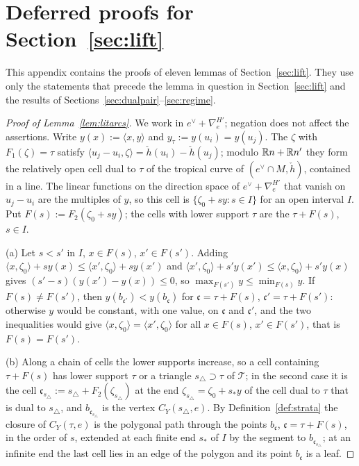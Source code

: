 \section{Deferred proofs for Section~\ref{sec:lift}}\label{app:liftproofs}

This appendix contains the proofs of eleven lemmas of Section~\ref{sec:lift}. They use only the statements that precede
the lemma in question in Section~\ref{sec:lift} and the results of Sections~\ref{sec:dualpair}--\ref{sec:regime}.

\begin{proof}[Proof of Lemma~\ref{lem:litarcs}]
We work in $e^\vee+\nabla^{H'}_e$; negation does not affect the assertions. Write $y(x):=\langle x,y\rangle$ and
$y_\tau:=y(u_i)=y(u_j)$. The $\zeta$ with $F_1(\zeta)=\tau$ satisfy $\langle u_j-u_i,\zeta\rangle=\check h(u_i)-\check
h(u_j)$; modulo $\mathbb R n+\mathbb R n'$ they form the relatively open cell dual to $\tau$ of the tropical curve of $(e^\vee\cap
M,\check h)$, contained in a line. The linear functions on the direction space of $e^\vee+\nabla^{H'}_e$ that vanish on
$u_j-u_i$ are the multiples of $y$, so this cell is $\{\zeta_0+sy:s\in I\}$ for an open interval $I$. Put
$F(s):=F_2(\zeta_0+sy)$; the cells with lower support $\tau$ are the $\tau+F(s)$, $s\in I$.

(a) Let $s<s'$ in $I$, $x\in F(s)$, $x'\in F(s')$. Adding $\langle x,\zeta_0\rangle+sy(x)\le\langle
x',\zeta_0\rangle+sy(x')$ and $\langle x',\zeta_0\rangle+s'y(x')\le\langle x,\zeta_0\rangle+s'y(x)$ gives
$(s'-s)(y(x')-y(x))\le0$, so $\max_{F(s')}y\le\min_{F(s)}y$. If $F(s)\ne F(s')$, then $y(b_{\mathfrak
c'})<y(b_{\mathfrak c})$ for $\mathfrak c=\tau+F(s)$, $\mathfrak c'=\tau+F(s')$: otherwise $y$ would be constant, with
one value, on $\mathfrak c$ and $\mathfrak c'$, and the two inequalities would give $\langle x,\zeta_0\rangle=\langle
x',\zeta_0\rangle$ for all $x\in F(s)$, $x'\in F(s')$, that is $F(s)=F(s')$.

(b) Along a chain of cells the lower supports increase, so a cell containing $\tau+F(s)$ has lower support $\tau$ or a
triangle ${s_\triangle}\supset\tau$ of $\mathcal T$; in the second case it is the cell $\mathfrak c_{s_\triangle}:={s_\triangle}+F_2(\zeta_{s_\triangle})$
at the end $\zeta_{s_\triangle}=\zeta_0+s_*y$ of the cell dual to $\tau$ that is dual to ${s_\triangle}$, and $b_{\mathfrak c_{s_\triangle}}$
is the vertex $C_Y({s_\triangle},e)$. By Definition~\ref{def:strata} the closure of $C_Y(\tau,e)$ is the polygonal path through
the points $b_{\mathfrak c}$, $\mathfrak c=\tau+F(s)$, in the order of $s$, extended at each finite end $s_*$ of $I$ by
the segment to $b_{\mathfrak c_{s_\triangle}}$; at an infinite end the last cell lies in an edge of the polygon and its point
$b_{\mathfrak c}$ is a leaf.


\end{proof}
